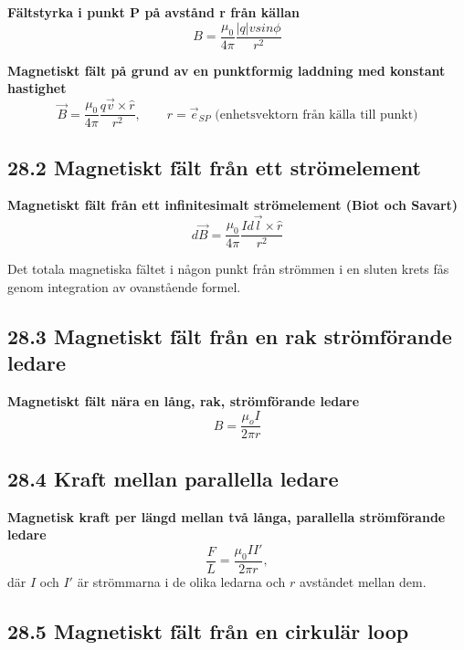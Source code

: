 \documentclass[a4paper]{article}
\begin{document}
\textbf{Fältstyrka i punkt P på avstånd r från källan}
\begin{equation}
B = \dfrac{\mu_0}{4 \pi} \dfrac{|q|vsin\phi}{r^2}
\end{equation}

\textbf{Magnetiskt fält på grund av en punktformig laddning med konstant hastighet}
\begin{equation}
\vec{B} = \dfrac{\mu_0}{4\pi} \dfrac{q \vec{v} \times \hat{r}}{r^2}, \qquad \text{$\hat{r} = \vec{e}_{SP}$ (enhetsvektorn från källa till punkt)}
\end{equation}

\subsection*{28.2 Magnetiskt fält från ett strömelement}
\textbf{Magnetiskt fält från ett infinitesimalt strömelement (Biot och Savart)}
\begin{equation}
d \vec{B} = \dfrac{\mu_0}{4\pi} \dfrac{Id \vec{l} \times \hat{r}}{r^2}
\end{equation}

Det totala magnetiska fältet i någon punkt från strömmen i en sluten krets fås genom integration av ovanstående formel.

\subsection*{28.3 Magnetiskt fält från en rak strömförande ledare}
\textbf{Magnetiskt fält nära en lång, rak, strömförande ledare}
\begin{equation}
B = \dfrac{\mu_o I}{2 \pi r}
\end{equation}

\subsection*{28.4 Kraft mellan parallella ledare}
\textbf{Magnetisk kraft per längd mellan två långa, parallella strömförande ledare}
\begin{equation}
\dfrac{F}{L} = \dfrac{\mu_0 I I'}{2 \pi r},
\end{equation}
där $I$ och $I'$ är strömmarna i de olika ledarna och $r$ avståndet mellan dem.

\subsection*{28.5 Magnetiskt fält från en cirkulär loop}
\end{document}
